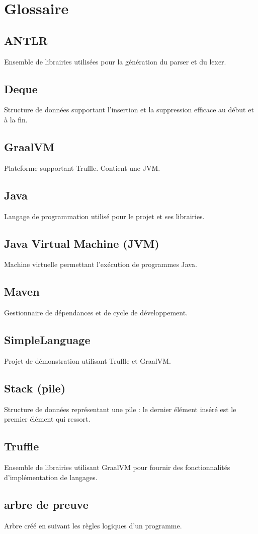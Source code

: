 \documentclass[../report.tex]{subfiles}
\begin{document}
\section{Glossaire}\label{sec:glossary}
\subsection*{ANTLR}
Ensemble de librairies utilisées pour la génération du parser et du lexer.
\subsection*{Deque}
Structure de données supportant l'insertion et la suppression efficace au début et à la fin.
\subsection*{GraalVM}
Plateforme supportant Truffle. Contient une JVM.
\subsection*{Java}
Langage de programmation utilisé pour le projet et ses librairies.
\subsection*{Java Virtual Machine (JVM)}
Machine virtuelle permettant l'exécution de programmes Java.
\subsection*{Maven}
Gestionnaire de dépendances et de cycle de développement.
\subsection*{SimpleLanguage}
Projet de démonstration utilisant Truffle et GraalVM.
\subsection*{Stack (pile)}
Structure de données représentant une pile : le dernier élément inséré est le premier élément qui ressort.
\subsection*{Truffle}
Ensemble de librairies utilisant GraalVM pour fournir des fonctionnalités d'implémentation de langages.
\subsection*{arbre de preuve}
Arbre créé en suivant les règles logiques d'un programme.
\end{document}

